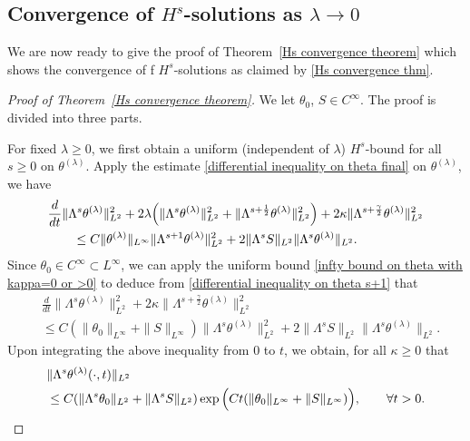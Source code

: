 \documentclass[reqno]{amsart}%
\theoremstyle{definition}
\theoremstyle{remark}
\numberwithin{equation}{section}
\newcommand{\1}{\mathbf{1}}
\numberwithin{equation}{section}
\numberwithin{theorem}{section}
\numberwithin{figure}{section}
\begin{document}
\subsection{Convergence of $H^s$-solutions as $\lambda\to0$}\label{convergence of Hs solution subsec}

We are now ready to give the proof of Theorem~\ref{Hs convergence theorem} which shows the convergence of f $H^s$-solutions as claimed by \eqref{Hs convergence thm}. 

\begin{proof}[Proof of Theorem~\ref{Hs convergence theorem}]
We let $\theta_0$, $S\in C^\infty$. The proof is divided into three parts.

\medskip

For fixed $\lambda\ge0$, we first obtain a uniform (independent of $\lambda$) $H^{s}$-bound for all $s\ge0$ on $\theta^{(\lambda)}$. Apply the estimate \eqref{differential inequality on theta final} on $\theta^{(\lambda)}$, we have
\begin{align}\label{differential inequality on theta s+1}
&\frac{d}{dt}\|\Lambda^{s}\theta^{(\lambda)}\|^2_{L^2}+2\lambda\Big(\|\Lambda^{s}\theta^{(\lambda)}\|^2_{L^2}+\|\Lambda^{s+\frac{1}{2}}\theta^{(\lambda)}\|^2_{L^2}\Big)+2\kappa\|\Lambda^{s+\frac{\gamma}{2}}\theta^{(\lambda)}\|^2_{L^2}\notag\\
&\qquad\le C\|\theta^{(\lambda)}\|_{L^\infty}\|\Lambda^{s+1}\theta^{(\lambda)}\|^2_{L^2}+2\|\Lambda^{s}S\|_{L^2}\|\Lambda^{s}\theta^{(\lambda)}\|_{L^2}.
\end{align}
Since $\theta_0\in C^\infty\subset L^\infty$, we can apply the uniform bound \eqref{infty bound on theta with kappa=0 or >0} to deduce from \eqref{differential inequality on theta s+1} that 
\begin{align*}
&\frac{d}{dt}\|\Lambda^{s}\theta^{(\lambda)}\|^2_{L^2}+2\kappa\|\Lambda^{s+\frac{\gamma}{2}}\theta^{(\lambda)}\|^2_{L^2}\\
&\le C(\|\theta_0\|_{L^\infty}+\|S\|_{L^\infty})\|\Lambda^{s}\theta^{(\lambda)}\|^2_{L^2}+2\|\Lambda^{s}S\|_{L^2}\|\Lambda^{s}\theta^{(\lambda)}\|_{L^2}.
\end{align*}
Upon integrating the above inequality from $0$ to $t$, we obtain, for all $\kappa\ge0$ that
\begin{align}\label{uniform Hs+1 bound on theta for all kappa}
&\|\Lambda^{s}\theta^{(\lambda)}(\cdot,t)\|_{L^2}\notag\\
&\le C(\|\Lambda^{s}\theta_0\|_{L^2}+\|\Lambda^{s}S\|_{L^2})\exp\Big(Ct(\|\theta_0\|_{L^\infty}+\|S\|_{L^\infty})\Big),\qquad\forall t>0.
\end{align}


\end{proof}
\end{document}
